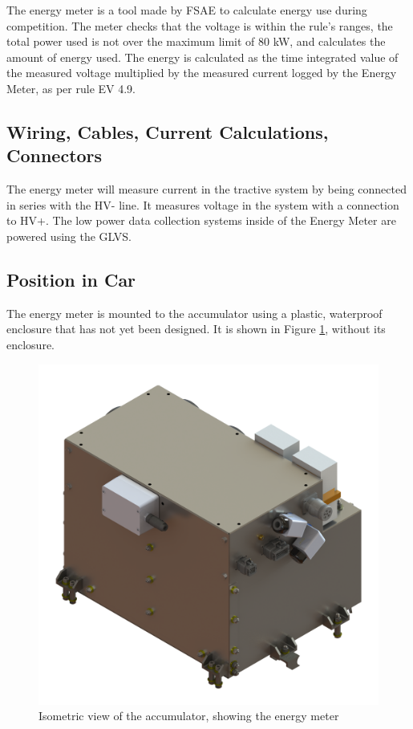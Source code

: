 \documentclass{article}
\begin{document}
        The energy meter is a tool made by FSAE to calculate energy use during competition. The meter checks that the voltage is within the rule's ranges, the total power used is not over the maximum limit of 80 kW, and calculates the amount of energy used. The energy is calculated as the time integrated value of the measured voltage multiplied by the measured current logged by the Energy Meter, as per rule EV 4.9.

    \subsection{Wiring, Cables, Current Calculations, Connectors}


        The energy meter will measure current in the tractive system by being connected in series with the HV- line. It measures voltage in the system with a connection to HV+. The low power data collection systems inside of the Energy Meter are powered using the GLVS.

    \subsection{Position in Car}

        The energy meter is mounted to the accumulator using a plastic, waterproof enclosure that has not yet been designed. It is shown in Figure \ref{accumiso}, without its enclosure.

        \begin{figure}[H]
            \centering
            \includegraphics[width = 0.7 \textwidth]{accumulator_isoview}
            \caption{Isometric view of the accumulator, showing the energy meter}
            \label{accumiso}
        \end{figure}
\end{document}
